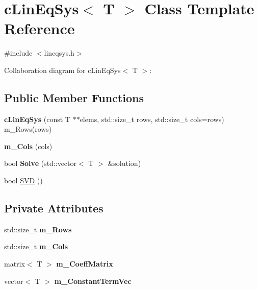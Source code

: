 \hypertarget{classcLinEqSys}{\section{c\-Lin\-Eq\-Sys$<$ T $>$ Class Template Reference}
\label{classcLinEqSys}
}


{\ttfamily \#include $<$lineqsys.\-h$>$}



Collaboration diagram for c\-Lin\-Eq\-Sys$<$ T $>$\-:
\subsection*{Public Member Functions}
\begin{DoxyCompactItemize}
\item 
\hypertarget{classcLinEqSys_ab2ca119b3532461229f9e069cda97042}{{\bfseries c\-Lin\-Eq\-Sys} (const T $\ast$$\ast$elems, std\-::size\-\_\-t rows, std\-::size\-\_\-t cols=rows) m\-\_\-\-Rows(rows)}\label{classcLinEqSys_ab2ca119b3532461229f9e069cda97042}

\item 
\hypertarget{classcLinEqSys_a2bc3258e2a4290b3e4d4d61a3dc6e3b3}{{\bfseries m\-\_\-\-Cols} (cols)}\label{classcLinEqSys_a2bc3258e2a4290b3e4d4d61a3dc6e3b3}

\item 
\hypertarget{classcLinEqSys_a0e0446ea5f7c92f3af099f1665fed022}{bool {\bfseries Solve} (std\-::vector$<$ T $>$ \&solution)}\label{classcLinEqSys_a0e0446ea5f7c92f3af099f1665fed022}

\item 
bool \hyperlink{classcLinEqSys_a5cf8e03b2a4a4526489527f7704150e6}{S\-V\-D} ()
\end{DoxyCompactItemize}
\subsection*{Private Attributes}
\begin{DoxyCompactItemize}
\item 
\hypertarget{classcLinEqSys_a7ee34013a76b86aa51b4adf0d1104ff0}{std\-::size\-\_\-t {\bfseries m\-\_\-\-Rows}}\label{classcLinEqSys_a7ee34013a76b86aa51b4adf0d1104ff0}

\item 
\hypertarget{classcLinEqSys_a8a80d36df2affff15567d6cf7bc55ef9}{std\-::size\-\_\-t {\bfseries m\-\_\-\-Cols}}\label{classcLinEqSys_a8a80d36df2affff15567d6cf7bc55ef9}

\item 
\hypertarget{classcLinEqSys_a8dd9080aae99ba00ff063ba3ba40af09}{matrix$<$ T $>$ {\bfseries m\-\_\-\-Coeff\-Matrix}}\label{classcLinEqSys_a8dd9080aae99ba00ff063ba3ba40af09}

\item 
\hypertarget{classcLinEqSys_aa29c60ed76caca4b60af246e3cbadc9b}{vector$<$ T $>$ {\bfseries m\-\_\-\-Constant\-Term\-Vec}}\label{classcLinEqSys_aa29c60ed76caca4b60af246e3cbadc9b}

\end{DoxyCompactItemize}


